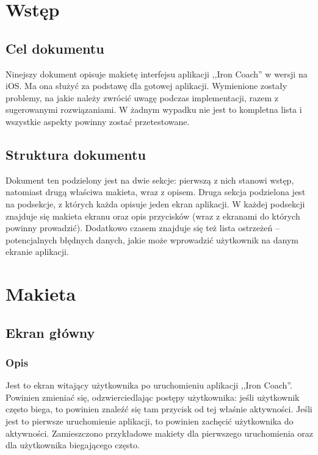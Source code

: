

\tableofcontents
\clearpage
\section{Wstęp}
\subsection{Cel dokumentu}
\noindent Ninejszy dokument opisuje makietę interfejsu aplikacji ,,Iron Coach'' w wersji na iOS. Ma ona służyć za podstawę dla gotowej aplikacji. Wymienione zostały problemy, na jakie należy zwrócić uwagę podczas implementacji, razem z sugerowanymi rozwiązaniami. W żadnym wypadku nie jest to kompletna lista i wszystkie aspekty powinny zostać przetestowane.
\subsection{Struktura dokumentu}
\noindent Dokument ten podzielony jest na dwie sekcje: pierwszą z nich stanowi wstęp, natomiast drugą właściwa makieta, wraz z opisem. Druga sekcja podzielona jest na podsekcje, z których każda opisuje jeden ekran aplikacji. W każdej podsekcji znajduje się makieta ekranu oraz opis przycisków (wraz z ekranami do których powinny prowadzić). Dodatkowo czasem znajduje się też lista ostrzeżeń -- potencjalnych błędnych danych, jakie może wprowadzić użytkownik na danym ekranie aplikacji.
\section{Makieta}
\subsection{Ekran główny}
\subsubsection{Opis}
\noindent Jest to ekran witający użytkownika po uruchomieniu aplikacji ,,Iron Coach''. Powinien zmieniać się, odzwierciedlając postępy użytkownika: jeśli użytkownik często biega, to powinien znaleźć się tam przycisk od tej właśnie aktywności. Jeśli jest to pierwsze uruchomienie aplikacji, to powinien zachęcić użytkownika do aktywności. Zamieszczono przykładowe makiety dla pierwszego uruchomienia oraz dla użytkownika biegającego często.
